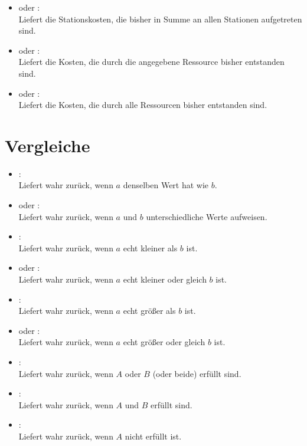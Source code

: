 \begin{itemize}
\item
{} oder :\\
Liefert die Stationskosten, die bisher in Summe an allen Stationen aufgetreten sind.

\item
{} oder :\\
Liefert die Kosten, die durch die angegebene Ressource bisher entstanden sind.

\item
{} oder :\\
Liefert die Kosten, die durch alle Ressourcen bisher entstanden sind.

\end{itemize}



\chapter{Vergleiche}

\begin{itemize}

\item
{}:\\
Liefert wahr zurück, wenn $a$ denselben Wert hat wie $b$.

\item
{} oder :\\
Liefert wahr zurück, wenn $a$ und $b$ unterschiedliche Werte aufweisen.

\item
{}:\\
Liefert wahr zurück, wenn $a$ echt kleiner als $b$ ist.

\item
{} oder :\\
Liefert wahr zurück, wenn $a$ echt kleiner oder gleich $b$ ist.

\item
{}:\\
Liefert wahr zurück, wenn $a$ echt größer als $b$ ist.

\item
{} oder :\\
Liefert wahr zurück, wenn $a$ echt größer oder gleich $b$ ist.

\item
{}:\\
Liefert wahr zurück, wenn $A$ oder $B$ (oder beide) erfüllt sind.

\item
{}:\\
Liefert wahr zurück, wenn $A$ und $B$ erfüllt sind.

\item
{}:\\
Liefert wahr zurück, wenn $A$ nicht erfüllt ist.

\end{itemize}

